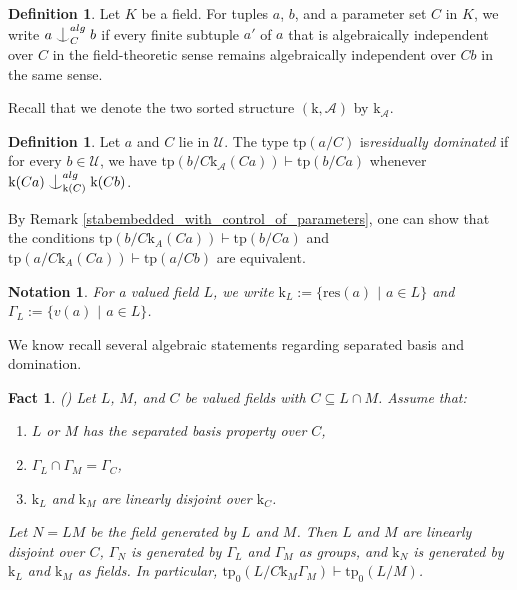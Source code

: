 \documentclass[12pt]{article}
\newcommand{\tpp}{\mathrm{tp}}
\newcommand{\res}{\mathrm{res}}
\newcommand{\acl}{\mathrm{acl}}
\newcommand{\dcl}{\mathrm{dcl}}
\newcommand{\val}{\textit{v}}
\newcommand{\0}{\emptyset}
\newcommand{\rf}{\mathrm{k}}
\newcommand{\A}{\mathcal{A}}
\newcommand{\U}{\mathcal{U}}
\newcommand{\Ualg}{\mathcal{U}_0}
\def\forkindep{\mathrel{\raise0.2ex\hbox{\ooalign{\hidewidth$\vert$\hidewidth\cr\raise-0.9ex\hbox{$\smile$}}}}}
\theoremstyle{plain}%
\newtheorem{rem}[thm]{Remark}
\newtheorem{fact}[thm]{Fact}
\newtheorem{notation}[thm]{Notation}
\theoremstyle{definition}
\newtheorem{defn}[thm]{Definition}
\theoremstyle{remark}
\begin{document}




\begin{defn}
    Let $K$ be a field. For tuples $a$, $b$, and a parameter set $C$ in $K$, we write $a\forkindep_{C}^{alg} b$ if every finite subtuple $a'$ of $a$ that is algebraically independent over $C$ in the field-theoretic sense remains algebraically independent over $Cb$ in the same sense.
\end{defn}

Recall that we denote the two sorted structure $(\rf,\mathcal{A})$ by $\rf_{\mathcal{A}}$. 

\begin{defn}\label{def_res_dom}
    Let $a$ and $C$ lie in $\U$. The type $\tpp(a/C)$ is\textit{residually dominated} if for every $b\in \U$, we have $\tpp(b/C\rf_{\mathcal{A}}(Ca))\vdash \tpp(b/Ca)$ whenever $\rf(Ca)\forkindep^{alg}_{\rf(C)}\rf(Cb)$.
\end{defn}

By Remark \ref{stabembedded_with_control_of_parameters}, one can show that the conditions $\tpp(b/C\rf_{A}(Ca)) \vdash \tpp(b/Ca)$ and $\tpp(a/C\rf_{A}(Ca))\vdash \tpp(a/Cb)$ are equivalent. %

\begin{notation}
For a valued field $L$, we write $\rf_L:=\{\res(a)$ $|$ $ a\in L\}$ and $\Gamma_L:= \{\val(a)$ $ \mid$ $ a\in L\}$.
\end{notation}
We know recall several algebraic statements regarding separated basis and domination.
\begin{fact}\label{generated_by_rf_and_gamma} (\cite[Proposition 2.7]{EHS23}) Let $L$, $M$, and $C$ be valued fields with $C \subseteq L \cap M$. Assume that: \begin{enumerate} 
\item $L$ or $M$ has the separated basis property over $C$, \item $\Gamma_L\cap \Gamma_M = \Gamma_C$,

\item $\rf_L$ and $\rf_M$ are linearly disjoint over $\rf_C$. 
\end{enumerate} 
Let $N = LM$ be the field generated by $L$ and $M$. Then $L$ and $M$ are linearly disjoint over $C$, $\Gamma_N$ is generated by $\Gamma_L$ and $\Gamma_M$ as groups, and $\rf_N$ is generated by $\rf_L$ and $\rf_M$ as fields. In particular, $\tpp_0(L/C\rf_M \Gamma_M)\vdash \tpp_0(L/M)$.
\end{fact}
\end{document}

